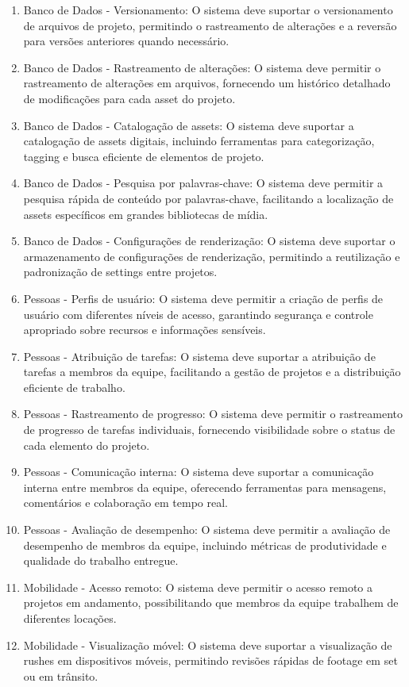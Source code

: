 \begin{enumerate}
  \item Banco de Dados - Versionamento: O sistema deve suportar o versionamento de arquivos de projeto, permitindo o rastreamento de alterações e a reversão para versões anteriores quando necessário.
  \item Banco de Dados - Rastreamento de alterações: O sistema deve permitir o rastreamento de alterações em arquivos, fornecendo um histórico detalhado de modificações para cada asset do projeto.
  \item Banco de Dados - Catalogação de assets: O sistema deve suportar a catalogação de assets digitais, incluindo ferramentas para categorização, tagging e busca eficiente de elementos de projeto.
  \item Banco de Dados - Pesquisa por palavras-chave: O sistema deve permitir a pesquisa rápida de conteúdo por palavras-chave, facilitando a localização de assets específicos em grandes bibliotecas de mídia.
  \item Banco de Dados - Configurações de renderização: O sistema deve suportar o armazenamento de configurações de renderização, permitindo a reutilização e padronização de settings entre projetos.
  \item Pessoas - Perfis de usuário: O sistema deve permitir a criação de perfis de usuário com diferentes níveis de acesso, garantindo segurança e controle apropriado sobre recursos e informações sensíveis.
  \item Pessoas - Atribuição de tarefas: O sistema deve suportar a atribuição de tarefas a membros da equipe, facilitando a gestão de projetos e a distribuição eficiente de trabalho.
  \item Pessoas - Rastreamento de progresso: O sistema deve permitir o rastreamento de progresso de tarefas individuais, fornecendo visibilidade sobre o status de cada elemento do projeto.
  \item Pessoas - Comunicação interna: O sistema deve suportar a comunicação interna entre membros da equipe, oferecendo ferramentas para mensagens, comentários e colaboração em tempo real.
  \item Pessoas - Avaliação de desempenho: O sistema deve permitir a avaliação de desempenho de membros da equipe, incluindo métricas de produtividade e qualidade do trabalho entregue.
  \item Mobilidade - Acesso remoto: O sistema deve permitir o acesso remoto a projetos em andamento, possibilitando que membros da equipe trabalhem de diferentes locações.
  \item Mobilidade - Visualização móvel: O sistema deve suportar a visualização de rushes em dispositivos móveis, permitindo revisões rápidas de footage em set ou em trânsito.

\end{enumerate}
